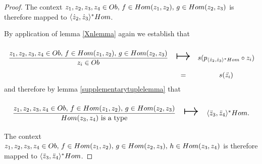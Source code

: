 \begin{proof}
The context $z_1,z_2,z_3,z_4 \in Ob,\,f \in Hom(z_1,z_2),\,g \in Hom(z_2,z_3)$ is therefore mapped to $\langle\dot z_2,\dot z_3\rangle^*Hom$.

By application of lemma \ref{Xnlemma} again we establish that 
\begin{equation*}
\begin{array}{c c c}
\forceSOURCEwidth & & \forceTARGETwidth \\ [-0.1cm]
\gatdisplayrule{\associativitypremisepop}{\ofT{z_i}{Ob}} & \Imapsto & s(p_{\associativitypremisepopmapped} \circ z_i) \\
                                                            & = & s(\ddot{z_i})
\end{array}
\end{equation*}
and therefore by  lemma \ref{supplementarytuplelemma} that 
\begin{equation*}
\begin{array}{c c c}
\forceSOURCEwidth & & \forceTARGETwidth \\ [-0.1cm]
\gatdisplayrule{\associativitypremisepop}{\isT{Hom(z_3,z_4)}} & \Imapsto & \associativitypremisemapped.
\end{array}
\end{equation*}
The context $z_1,z_2,z_3,z_4 \in Ob,\,f \in Hom(z_1,z_2),\,g \in Hom(z_2,z_3),\,h \in Hom(z_3,z_4)$ is therefore mapped to $\langle\ddot z_3,\ddot z_4\rangle^*Hom$.
\end{proof}

